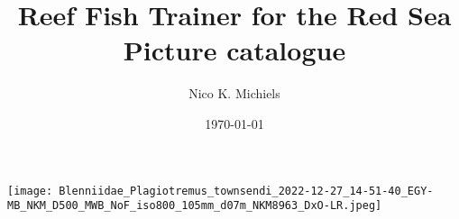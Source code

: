\documentclass[a4paper]{article}
\begin{document}
\setcounter{secnumdepth}{-1}


\title{Reef Fish Trainer for the Red Sea\\
Picture catalogue}

\author{Nico K. Michiels}

\date{\today} %




\pagestyle{fancy} 
\fancyhead[L]{} %
\fancyhead[R]{\vspace{0.5cm} \thepage} %
\fancyfoot{} %

\setlength{\parindent}{0pt}



\maketitle

\begin{center}
    \texttt{[image: Blenniidae\_Plagiotremus\_townsendi\_2022-12-27\_14-51-40\_EGY-MB\_NKM\_D500\_MWB\_NoF\_iso800\_105mm\_d07m\_NKM8963\_DxO-LR.jpeg]}
\end{center}
\end{document}
